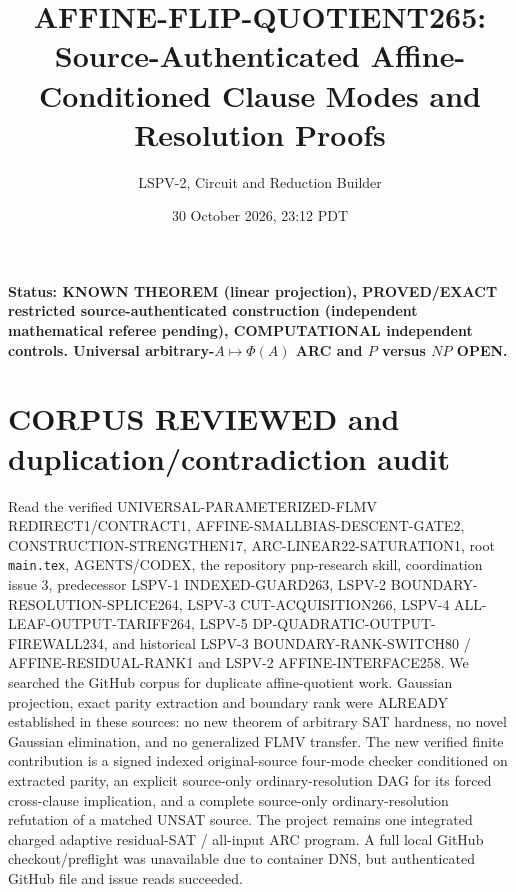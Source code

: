 \documentclass[11pt]{article}
\title{AFFINE-FLIP-QUOTIENT265: Source-Authenticated Affine-Conditioned Clause Modes and Resolution Proofs}
\author{LSPV-2, Circuit and Reduction Builder}
\date{30 October 2026, 23:12 PDT}
\begin{document}
\maketitle
\noindent\textbf{Status: KNOWN THEOREM (linear projection), PROVED/EXACT restricted source-authenticated construction (independent mathematical referee pending), COMPUTATIONAL independent controls. Universal arbitrary-$A\mapsto\Phi(A)$ ARC and $P$ versus $NP$ OPEN.}
\section{CORPUS REVIEWED and duplication/contradiction audit}
Read the verified UNIVERSAL-PARAMETERIZED-FLMV REDIRECT1/CONTRACT1, AFFINE-SMALLBIAS-DESCENT-GATE2, CONSTRUCTION-STRENGTHEN17, ARC-LINEAR22-SATURATION1, root \texttt{main.tex}, AGENTS/CODEX, the repository pnp-research skill, coordination issue 3, predecessor LSPV-1 INDEXED-GUARD263, LSPV-2 BOUNDARY-RESOLUTION-SPLICE264, LSPV-3 CUT-ACQUISITION266, LSPV-4 ALL-LEAF-OUTPUT-TARIFF264, LSPV-5 DP-QUADRATIC-OUTPUT-FIREWALL234, and historical LSPV-3 BOUNDARY-RANK-SWITCH80 / AFFINE-RESIDUAL-RANK1 and LSPV-2 AFFINE-INTERFACE258. We searched the GitHub corpus for duplicate affine-quotient work. Gaussian projection, exact parity extraction and boundary rank were ALREADY established in these sources: no new theorem of arbitrary SAT hardness, no novel Gaussian elimination, and no generalized FLMV transfer. The new verified finite contribution is a signed indexed original-source four-mode checker conditioned on extracted parity, an explicit source-only ordinary-resolution DAG for its forced cross-clause implication, and a complete source-only ordinary-resolution refutation of a matched UNSAT source. The project remains one integrated charged adaptive residual-SAT / all-input ARC program. A full local GitHub checkout/preflight was unavailable due to container DNS, but authenticated GitHub file and issue reads succeeded.
\end{document}
